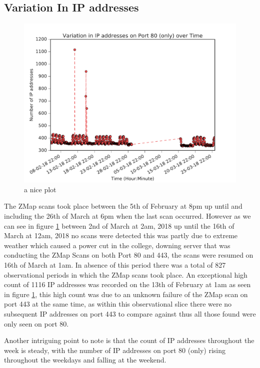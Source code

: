 \documentclass[a4wide,leqno,12pt]{report}
\begin{document}
\subsection{Variation In IP addresses}
\begin{figure}[H]
\centering
\includegraphics[scale=.5]{pdf_images/VariationInIpAddressesOnPort80OverTime}
\caption{a nice plot}
\label{fig:port80ZMap}
\end{figure}

The ZMap scans took place between the 5th of February at 8pm up until and including the 26th of March at 6pm when the last scan occurred. However as we can see in figure \ref{fig:port80ZMap} between
2nd of March at 2am, 2018  up until the 16th of March at 12am, 2018 no scans were detected this was partly due to extreme weather which caused a power cut in the college, downing server that was conducting the ZMap Scans on both Port 80 and 443, the scans were resumed on 16th of March at 1am. In absence of this period there was a total of 827 observational periods in which the ZMap scans took place. An exceptional high count of 1116 IP addresses was recorded on the 13th of February at 1am as seen in figure \ref{fig:port80ZMap}, this high count was due to an unknown failure of the ZMap scan on port 443 at the same time, as within this observational slice there were no subsequent IP addresses on port 443 to compare against thus all those found were only seen on port 80.


Another intriguing  point to note is that the count of IP addresses throughout the week is steady, with the number of IP addresses on port 80 (only) rising throughout the weekdays and falling at the weekend.\\
\end{document}
